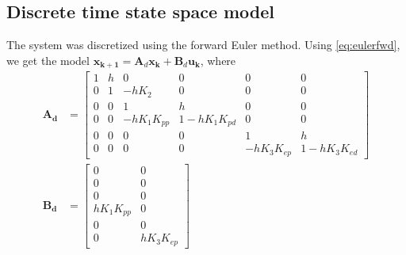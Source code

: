 \subsection{Discrete time state space model}
The system was discretized using the forward Euler method. Using \cref{eq:eulerfwd}, we get the model $\mathbf{x_{k+1}} = \mathbf{A}_d\mathbf{x_k}+\mathbf{B}_d \mathbf{u_k}$, where
\begin{subequations}
    \begin{align}
    \mathbf{A_d} &= \begin{bmatrix}
        1 & h & 0           & 0            & 0           & 0         \\
        0 & 1 & -hK_2       & 0            & 0           & 0         \\
        0 & 0 & 1           & h            & 0           & 0         \\
        0 & 0 & -hK_1K_{pp} & 1-hK_1K_{pd} & 0           & 0         \\
        0 & 0 & 0           & 0            & 1           & h         \\
        0 & 0 & 0           & 0            & -hK_3K_{ep} & 1-hK_3K_{ed}
    \end{bmatrix}\\
    \mathbf{B_d} &= \begin{bmatrix}
        0          & 0        \\
        0          & 0        \\
        0          & 0        \\
        hK_1K_{pp} & 0        \\
        0          & 0        \\
        0          & hK_3K_{ep}
    \end{bmatrix}
    \end{align}
\end{subequations}

